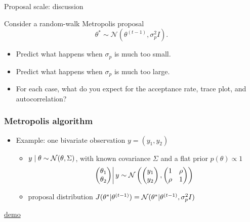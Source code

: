 \documentclass[10pt]{beamer}
\begin{document}
\begin{frame}{Proposal scale: discussion}

  Consider a random-walk Metropolis proposal
  \[
    \theta^*\sim\mathcal{N}(\theta^{(t-1)},\sigma_p^2 I).
  \]

  \begin{itemize}
  \item Predict what happens when $\sigma_p$ is much too small.
  \item Predict what happens when $\sigma_p$ is much too large.
  \item For each case, what do you expect for the acceptance rate, trace
    plot, and autocorrelation?
  \end{itemize}


\end{frame}

\begin{frame}

\frametitle{Metropolis algorithm}

  \begin{itemize}
  \item Example: one bivariate observation $y=(y_1,y_2)$
    \begin{itemize}
    \item $y\mid\theta\sim\mathcal{N}(\theta,\Sigma)$, with known covariance
      $\Sigma$ and a flat prior $p(\theta)\propto1$
       \begin{equation*}
         \left.
         \begin{pmatrix}
           \theta_1\\
           \theta_2
         \end{pmatrix}
         \right| y \sim
         \mathcal{N}\left(
           \begin{pmatrix}
             y_1\\
             y_2
           \end{pmatrix},
           \begin{pmatrix}
             1 & \rho\\
             \rho & 1
         \end{pmatrix}
       \right)
       \end{equation*}
     \item proposal distribution
       $J(\theta^{*}|\theta^{(t-1)})
       =\mathcal{N}(\theta^{*}|\theta^{(t-1)},\sigma_p^2 I)$
     \end{itemize}
   \end{itemize}

  \center
  \href{https://chi-feng.github.io/mcmc-demo/app.html?algorithm=RandomWalkMH&target=standard}{demo}

\end{frame}
\end{document}
